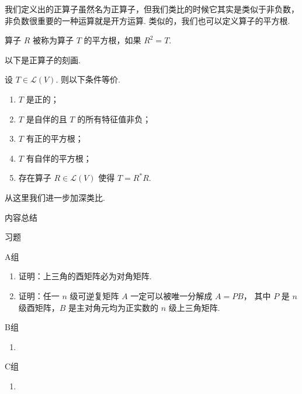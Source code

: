 我们定义出的正算子虽然名为正算子，但我们类比的时候它其实是类似于非负数，
非负数很重要的一种运算就是开方运算. 类似的，我们也可以定义算子的平方根.

\begin{definition}
     算子 $ R $ 被称为算子 $ T $ 的平方根，如果 $ R^{2} = T $. 
\end{definition}

以下是正算子的刻画. 

\begin{theorem}
    设 $ T \in \mathcal{L}(V) $. 则以下条件等价. 
    \begin{enumerate}
        \item $ T $ 是正的；
        
        \item $ T $ 是自伴的且 $ T $ 的所有特征值非负；
        
        \item $ T $ 有正的平方根；
        
        \item $ T $ 有自伴的平方根；
        
        \item 存在算子 $ R \in \mathcal{L}(V) $ 使得 $ T = R^{*}R $. 
    \end{enumerate}
\end{theorem}

从这里我们进一步加深类比. 

\vspace{2ex}
\centerline{\heiti \Large 内容总结}

\vspace{2ex}

\centerline{\heiti \Large 习题}
\vspace{2ex}
{\kaishu }
\begin{flushright}
    \kaishu

\end{flushright}
\centerline{\heiti A组}
\begin{enumerate}
    \item 证明：上三角的酉矩阵必为对角矩阵. 
    
    \item 证明：任一 $ n $ 级可逆复矩阵 $ A $ 一定可以被唯一分解成 $ A = PB $，
    其中 $ P $ 是 $ n $ 级酉矩阵，$ B $ 是主对角元均为正实数的 $ n $ 级上三角矩阵. 
\end{enumerate}
\centerline{\heiti B组}
\begin{enumerate}
    \item
\end{enumerate}
\centerline{\heiti C组}
\begin{enumerate}
    \item
\end{enumerate}
